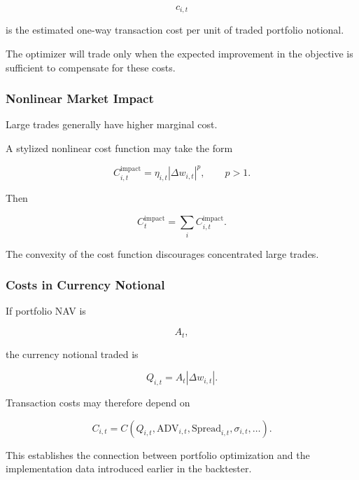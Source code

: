 \documentclass[11pt,a4paper]{article}
\begin{document}
\begin{equation}
c_{i,t}
\end{equation}

is the estimated one-way transaction cost per unit of traded portfolio notional.

The optimizer will trade only when the expected improvement in the objective is
sufficient to compensate for these costs.


\subsubsection{Nonlinear Market Impact}

Large trades generally have higher marginal cost.

A stylized nonlinear cost function may take the form

\begin{equation}
\boxed{
C_{i,t}^{\mathrm{impact}}
=
\eta_{i,t}
\left|
\Delta w_{i,t}
\right|^{p},
\qquad
p>1.
}
\end{equation}

Then

\begin{equation}
C_t^{\mathrm{impact}}
=
\sum_i
C_{i,t}^{\mathrm{impact}}.
\end{equation}

The convexity of the cost function discourages concentrated large trades.


\subsubsection{Costs in Currency Notional}

If portfolio NAV is

\begin{equation}
A_t,
\end{equation}

the currency notional traded is

\begin{equation}
Q_{i,t}
=
A_t
|\Delta w_{i,t}|.
\end{equation}

Transaction costs may therefore depend on

\begin{equation}
C_{i,t}
=
C
\left(
Q_{i,t},
\mathrm{ADV}_{i,t},
\mathrm{Spread}_{i,t},
\sigma_{i,t},
\ldots
\right).
\end{equation}

This establishes the connection between portfolio optimization and the
implementation data introduced earlier in the backtester.
\end{document}
